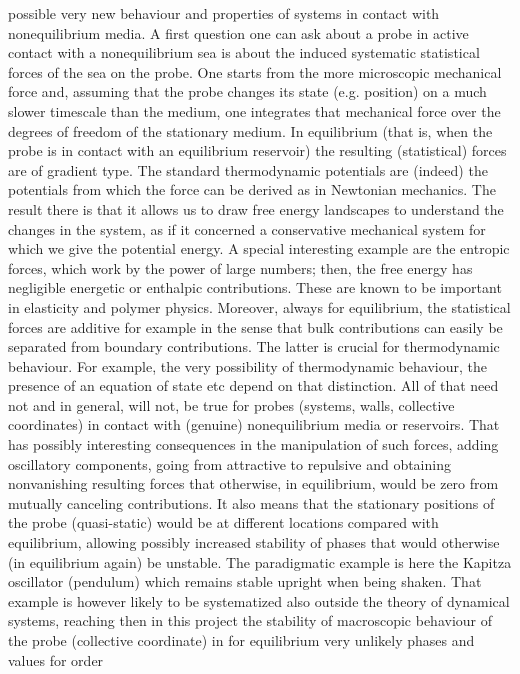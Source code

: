 possible very new behaviour and properties of systems in contact with nonequilibrium
media. A first question one can ask about a probe in active contact with a nonequilibrium
sea is about the induced systematic statistical forces of the sea on the probe.  One starts
from the more microscopic mechanical force and, assuming that the probe changes its state
(e.g. position) on a much slower timescale than the medium, one integrates that mechanical
force over the degrees of freedom of the stationary medium.  In equilibrium (that is, when
the probe is in contact with an equilibrium reservoir) the resulting (statistical) forces
are of gradient type.  The standard thermodynamic potentials are (indeed) the potentials
from which the force can be derived as in Newtonian mechanics. The result there is that it
allows us to draw free energy landscapes to understand the changes in the system, as if it
concerned a conservative mechanical system for which we give the potential energy.  A
special interesting example are the entropic forces, which work by the power of large
numbers; then, the free energy has negligible energetic or enthalpic contributions.  These
are known to be important in elasticity and polymer physics. Moreover, always for
equilibrium, the statistical forces are additive for example in the sense that bulk
contributions can easily be separated from boundary contributions.  The latter is crucial
for thermodynamic behaviour.  For example, the very possibility of thermodynamic behaviour,
the presence of an equation of state etc depend on that distinction.  All of that need not
and in general, will not,
be true for probes (systems, walls, collective coordinates) in contact with (genuine)
nonequilibrium media or reservoirs. That has possibly
interesting consequences in the manipulation of such forces, adding oscillatory components,
going from attractive to repulsive and obtaining nonvanishing resulting forces that
otherwise, in equilibrium, would be zero from mutually canceling contributions.
%
It also means that the stationary positions of the probe (quasi-static) would be at
different locations compared with equilibrium, allowing possibly increased stability of
phases that would otherwise (in equilibrium again) be unstable.  The paradigmatic example is
here the Kapitza oscillator (pendulum) which remains stable upright when being shaken.  That
example is however likely to be systematized also outside the theory of dynamical systems,
reaching then in this project the stability of macroscopic behaviour of the probe
(collective coordinate) in for equilibrium very unlikely phases and values for order
